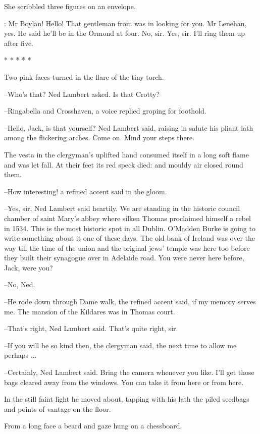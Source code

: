 She scribbled three figures on an envelope.

\missdunne:
Mr Boylan!
Hello!
That gentleman from  was in looking for you.
Mr Lenehan, yes.
He said he'll be in the Ormond at four.
No, sir.
Yes, sir.
I'll ring them up after five.


    * * * * *


Two pink faces turned in the flare of the tiny torch.

--Who's that? Ned Lambert asked.
Is that Crotty?

--Ringabella and Crosshaven,
a voice replied groping for foothold.

--Hello, Jack, is that yourself?
Ned Lambert said,
raising in salute his pliant lath
among the flickering arches.
Come on.
Mind your steps there.

The vesta in the clergyman's uplifted hand consumed itself
in a long soft
flame and was let fall.
At their feet its red speck died:
and mouldy air
closed round them.

--How interesting!
a refined accent said in the gloom.

--Yes, sir,
Ned Lambert said heartily.
We are standing in the historic
council chamber of saint Mary's abbey
where silken Thomas proclaimed
himself a rebel in 1534.
This is the most historic spot in all Dublin.
O'Madden Burke is going to write something about it
one of these days.
The old bank of Ireland was over the way
till the time of the union
and the
original jews' temple was here too
before they built their synagogue over
in Adelaide road.
You were never here before, Jack, were you?

--No, Ned.

--He rode down through Dame walk,
the refined accent said,
if my
memory serves me.
The mansion of the Kildares was in Thomas court.

--That's right,
Ned Lambert said.
That's quite right, sir.

--If you will be so kind then,
the clergyman said,
the next time to allow
me perhaps ...

--Certainly, Ned Lambert said.
Bring the camera whenever you like.
I'll get those bags cleared away from the windows.
You can take it from here or from here.

In the still faint light
he moved about,
tapping with his lath
the piled
seedbags and points of vantage on the floor.

From a long face
a beard and gaze hung on a chessboard.

